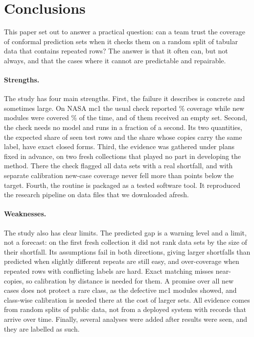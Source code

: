 \section{Conclusions}\label{sec:conclusion}

This paper set out to answer a practical question: can a team trust the coverage of conformal prediction sets when it checks them on a random split of tabular data that contains repeated rows? The answer is that it often can, but not always, and that the cases where it cannot are predictable and repairable.

\paragraph{Strengths.} The study has four main strengths. First, the failure it describes is concrete and sometimes large. On NASA mc1 the usual check reported \NCsMcOneReported{}\% coverage while new modules were covered \NCsMcOneNew{}\% of the time, and \NToolStdEmpty{} of them received an empty set. Second, the check needs no model and runs in a fraction of a second. Its two quantities, the expected share of seen test rows and the share whose copies carry the same label, have exact closed forms. Third, the evidence was gathered under plans fixed in advance, on two fresh collections that played no part in developing the method. There the check flagged all \NScpPos{} data sets with a real shortfall, and with separate calibration new-case coverage never fell more than \NWTwoWorstFixAbs{} points below the target. Fourth, the routine is packaged as a tested software tool. It reproduced the research pipeline on \NTvN{} data files that we downloaded afresh.

\paragraph{Weaknesses.} The study also has clear limits. The predicted gap is a warning level and a limit, not a forecast: on the first fresh collection it did not rank data sets by the size of their shortfall. Its assumptions fail in both directions, giving larger shortfalls than predicted when slightly different repeats are still easy, and over-coverage when repeated rows with conflicting labels are hard. Exact matching misses near-copies, so calibration by distance is needed for them. A promise over all new cases does not protect a rare class, as the defective mc1 modules showed, and class-wise calibration is needed there at the cost of larger sets. All evidence comes from random splits of public data, not from a deployed system with records that arrive over time. Finally, several analyses were added after results were seen, and they are labelled as such.

